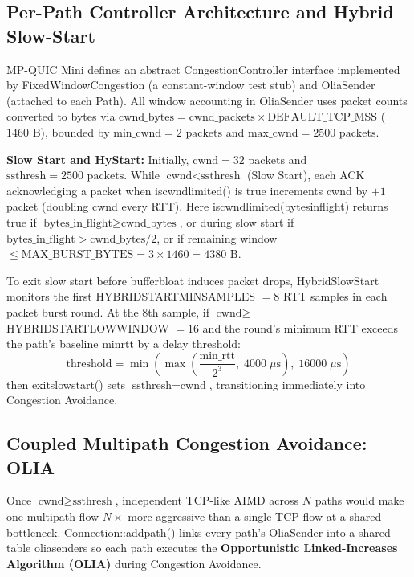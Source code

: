 \documentclass[10pt,a4paper]{article}
\newcommand{\codeul}{\textunderscore\hspace{0pt}}
\DeclareRobustCommand{\code}[1]{{\ttfamily\let\_\codeul #1}}
\begin{document}
\subsection{Per-Path Controller Architecture and Hybrid Slow-Start}
MP-QUIC Mini defines an abstract \code{CongestionController} interface implemented by \code{FixedWindowCongestion} (a constant-window test stub) and \code{OliaSender} (attached to each \code{Path}). All window accounting in \code{OliaSender} uses packet counts converted to bytes via $\text{cwnd\_bytes} = \text{cwnd\_packets} \times \text{DEFAULT\_TCP\_MSS}$ ($1460\text{ B}$), bounded by $\text{min\_cwnd} = 2\text{ packets}$ and $\text{max\_cwnd} = 2500\text{ packets}$.

\textbf{Slow Start and HyStart:}
Initially, $\text{cwnd} = 32\text{ packets}$ and $\text{ssthresh} = 2500\text{ packets}$. While $\text{cwnd} < \text{ssthresh}$ (Slow Start), each ACK acknowledging a packet when \code{is\_cwnd\_limited()} is true increments \code{cwnd} by $+1$ packet (doubling \code{cwnd} every RTT). Here \code{is\_cwnd\_limited(bytes\_in\_flight)} returns true if $\text{bytes\_in\_flight} \ge \text{cwnd\_bytes}$, or during slow start if $\text{bytes\_in\_flight} > \text{cwnd\_bytes} / 2$, or if remaining window $\le \text{MAX\_BURST\_BYTES} = 3 \times 1460 = 4380\text{ B}$.

To exit slow start before bufferbloat induces packet drops, \code{HybridSlowStart} monitors the first \code{HYBRID\_START\_MIN\_SAMPLES} $= 8$ RTT samples in each packet burst round. At the 8th sample, if $\text{cwnd} \ge$ \code{HYBRID\_START\_LOW\_WINDOW} $= 16$ and the round's minimum RTT exceeds the path's baseline \code{min\_rtt} by a delay threshold:
\begin{equation}
    \text{threshold} = \min\!\left(\max\!\left(\frac{\text{min\_rtt}}{2^3},\; 4000\;\mu\text{s}\right),\; 16000\;\mu\text{s}\right)
\end{equation}
then \code{exit\_slow\_start()} sets $\text{ssthresh} = \text{cwnd}$, transitioning immediately into Congestion Avoidance.

\subsection{Coupled Multipath Congestion Avoidance: OLIA}
Once $\text{cwnd} \ge \text{ssthresh}$, independent TCP-like AIMD across $N$ paths would make one multipath flow $N\times$ more aggressive than a single TCP flow at a shared bottleneck. \code{Connection::add\_path()} links every path's \code{OliaSender} into a shared table \code{olia\_senders} so each path executes the \textbf{Opportunistic Linked-Increases Algorithm (OLIA)} during Congestion Avoidance.
\end{document}
